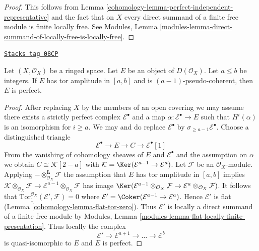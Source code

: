 \begin{proof}

This follows from Lemma \ref{cohomology-lemma-perfect-independent-representative}
and the fact that on $X$ every direct summand of a finite free module
is finite locally free. See Modules, Lemma
\ref{modules-lemma-direct-summand-of-locally-free-is-locally-free}.
\end{proof}

\begin{lemma}
\label{cohomology-lemma-perfect-precise}
\href{https://stacks.math.columbia.edu/tag/08CP}{\texttt{Stacks tag 08CP}}

Let $(X, \mathcal{O}_X)$ be a ringed space.
Let $E$ be an object of $D(\mathcal{O}_X)$.
Let $a \leq b$ be integers. If $E$ has tor amplitude in $[a, b]$
and is $(a - 1)$-pseudo-coherent, then $E$ is perfect.
\end{lemma}

\begin{proof}

After replacing $X$ by the members of an open covering we may assume there
exists a strictly perfect complex $\mathcal{E}^\bullet$ and a map
$\alpha : \mathcal{E}^\bullet \to E$ such that $H^i(\alpha)$ is an isomorphism
for $i \geq a$. We may and do replace $\mathcal{E}^\bullet$ by
$\sigma_{\geq a - 1}\mathcal{E}^\bullet$. Choose a distinguished triangle
$$
\mathcal{E}^\bullet \to E \to C \to \mathcal{E}^\bullet[1]
$$
From the vanishing of cohomology sheaves of $E$ and $\mathcal{E}^\bullet$
and the assumption on $\alpha$ we obtain $C \cong \mathcal{K}[2 - a]$ with
$\mathcal{K} = \Ker(\mathcal{E}^{a - 1} \to \mathcal{E}^a)$.
Let $\mathcal{F}$ be an $\mathcal{O}_X$-module.
Applying $- \otimes_{\mathcal{O}_X}^\mathbf{L} \mathcal{F}$
the assumption that $E$ has tor amplitude in $[a, b]$
implies $\mathcal{K} \otimes_{\mathcal{O}_X} \mathcal{F} \to
\mathcal{E}^{a - 1} \otimes_{\mathcal{O}_X} \mathcal{F}$ has image
$\Ker(\mathcal{E}^{a - 1} \otimes_{\mathcal{O}_X} \mathcal{F}
\to \mathcal{E}^a \otimes_{\mathcal{O}_X} \mathcal{F})$.
It follows that $\text{Tor}_1^{\mathcal{O}_X}(\mathcal{E}', \mathcal{F}) = 0$
where $\mathcal{E}' = \Coker(\mathcal{E}^{a - 1} \to \mathcal{E}^a)$.
Hence $\mathcal{E}'$ is flat (Lemma \ref{cohomology-lemma-flat-tor-zero}).
Thus $\mathcal{E}'$ is locally a direct summand of a finite free module by
Modules, Lemma \ref{modules-lemma-flat-locally-finite-presentation}.
Thus locally the complex
$$
\mathcal{E}' \to \mathcal{E}^{a + 1} \to \ldots \to \mathcal{E}^b
$$
is quasi-isomorphic to $E$ and $E$ is perfect.
\end{proof}

